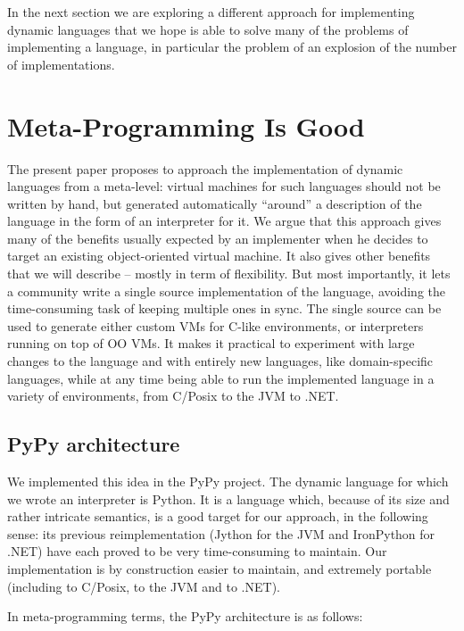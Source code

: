 \documentclass{llncs}
\begin{document}
In the next section we are exploring a different approach for implementing
dynamic languages that we hope is able to solve many of the problems of
implementing a language, in particular the problem of an explosion of the number
of implementations.

\section{Meta-Programming Is Good}

The present paper proposes to approach the implementation of dynamic
languages from a meta-level: virtual machines for such languages should
not be written by hand, but generated automatically ``around'' a
description of the language in the form of an interpreter for it.  We
argue that this approach gives many of the benefits usually expected by
an implementer when he decides to target an existing object-oriented
virtual machine.  It also gives other benefits that we will describe –
mostly in term of flexibility.  But most importantly, it lets a
community write a single source implementation of the language, avoiding
the time-consuming task of keeping multiple ones in sync.  The single
source can be used to generate either custom VMs for C-like
environments, or interpreters running on top of OO VMs.  It makes it
practical to experiment with large changes to the language and with
entirely new languages, like domain-specific languages, while at any
time being able to run the implemented language in a variety of
environments, from C/Posix to the JVM to .NET.

\subsection{PyPy architecture}

We implemented this idea in the PyPy project.  The dynamic language for
which we wrote an interpreter is Python.  It is a language which,
because of its size and rather intricate semantics, is a good target for
our approach, in the following sense: its previous reimplementation
(Jython for the JVM and IronPython for .NET) have each proved to be very
time-consuming to maintain.  Our implementation is by construction
easier to maintain, and extremely portable (including to C/Posix, to the
JVM and to .NET).

In meta-programming terms, the PyPy architecture is as follows:
\end{document}
